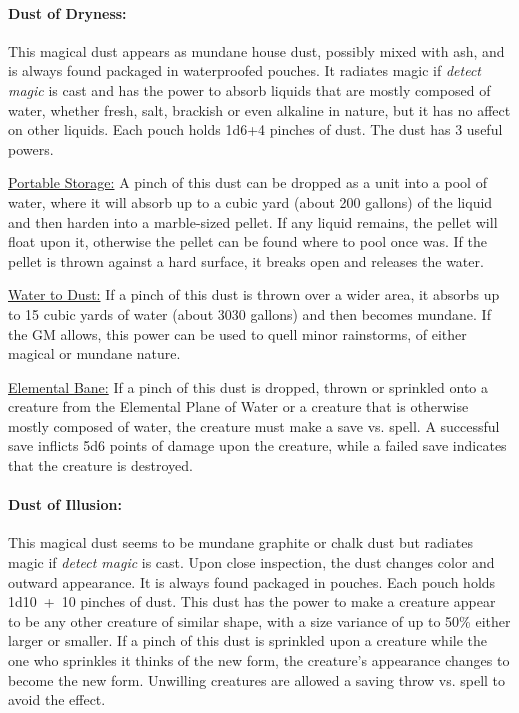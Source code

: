 \begin{multicols}{2}
\paragraph{Dust of Dryness:} This magical dust appears as mundane house dust, possibly mixed with ash, and is always found packaged in waterproofed pouches.  It radiates magic if \textit{detect magic} is cast and has the power to absorb liquids that are mostly composed of water, whether fresh, salt, brackish or even alkaline in nature, but it has no affect on other liquids.  Each pouch holds 1d6+4 pinches of dust.  The dust has 3 useful powers.

\underline{Portable Storage:} A pinch of this dust can be dropped as a unit into a pool of water, where it will absorb up to a cubic yard (about 200 gallons) of the liquid and then harden into a marble-sized pellet.  If any liquid remains, the pellet will float upon it, otherwise the pellet can be found where to pool once was.  If the pellet is thrown against a hard surface, it breaks open and releases the water.  

\underline{Water to Dust:} If a pinch of this dust is thrown over a wider area, it absorbs up to 15 cubic yards of water (about 3030 gallons) and then becomes mundane.  If the GM allows, this power can be used to quell minor rainstorms, of either magical or mundane nature.

\underline{Elemental Bane:} If a pinch of this dust is dropped, thrown or sprinkled onto a creature from the Elemental Plane of Water or a creature that is otherwise mostly composed of water, the creature must make a save vs. spell.  A successful save inflicts 5d6 points of damage upon the creature, while a failed save indicates that the creature is destroyed.

\paragraph{Dust of Illusion:} This magical dust seems to be mundane graphite or chalk dust but radiates magic if \textit{detect magic} is cast.  Upon close inspection, the dust changes color and outward appearance.  It is always found packaged in pouches.  Each pouch holds 1d10~+~10 pinches of dust.  This dust has the power to make a creature appear to be any other creature of similar shape, with a size variance of up to 50\% either larger or smaller.  If a pinch of this dust is sprinkled upon a creature while the one who sprinkles it thinks of the new form, the creature's appearance changes to become the new form.  Unwilling creatures are allowed a saving throw vs. spell to avoid the effect.  


\end{multicols}
